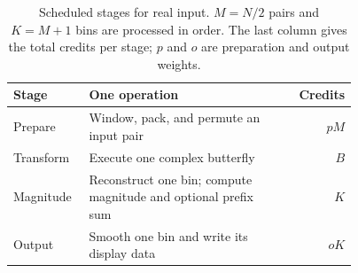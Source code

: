 \begin{table}[tb]
\centering\small
\begin{tabular}{@{}p{0.22\linewidth}p{0.55\linewidth}r@{}}
\toprule
Stage & One operation & Credits \\
\midrule
Prepare & Window, pack, and permute an input pair & $pM$ \\
Transform & Execute one complex butterfly & $B$ \\
Magnitude & Reconstruct one bin; compute magnitude and optional prefix sum & $K$ \\
Output & Smooth one bin and write its display data & $oK$ \\
\bottomrule
\end{tabular}
\caption{Scheduled stages for real input. $M=N/2$ pairs and $K=M+1$ bins
are processed in order. The last column gives the total credits per stage;
$p$ and $o$ are preparation and output weights.}
\label{tab:stages}
\end{table}
